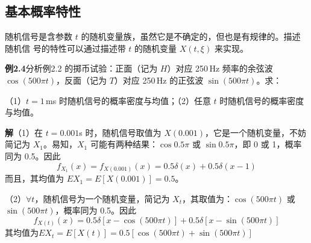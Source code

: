 \documentclass[11pt,openany,UTF8]{ctexbook}
\newcommand{\E}{E}                                 %
\begin{document}
\subsection{基本概率特性}
随机信号是含参数 $t$ 的随机变量族\nobreak，虽然它是不确定的\nobreak，但也是有规律的\nobreak。描述随机信
号的特性可以通过描述带 $t$ 的随机变量 $X(t,\xi)$ 来实现\nobreak。%

\begin{examplebox}
\textbf{例2.4}\quad 分析例2.2 的掷币试验\nobreak：正面（记为 $H$\nobreak）对应 250\,Hz 频率的余弦波 $\cos(500\pi t)$\nobreak，反面（记为 $T$\nobreak）对应 250\,Hz 的正弦波 $\sin(500\pi t)$\nobreak。求\nobreak：

（1\nobreak）$t=1$\,ms 时随机信号的概率密度与均值\nobreak；（2\nobreak）任意 $t$ 时随机信号的概率密度与均值\nobreak。

\textbf{解}\quad （1\nobreak）在 $t=0.001$s 时\nobreak，随机信号取值为 $X(0.001)$\nobreak，它是一个随机变量\nobreak，不妨简记为 $X_1$\nobreak。易知\nobreak，$X_1$ 可能有两种结果\nobreak：$\cos 0.5\pi$ 或 $\sin 0.5\pi$\nobreak，即 0 或 1\nobreak，概率同为 0.5\nobreak。因此
\[
  f_{X_1}(x)=f_{X(0.001)}(x)=0.5\delta(x)+0.5\delta(x-1)
\]
而且\nobreak，其均值为 $\E X_1=\E[X(0.001)]=0.5$\nobreak。

（2\nobreak）$\forall t$\nobreak，随机信号为一个随机变量\nobreak，简记为 $X_t$\nobreak，其取值为\nobreak：$\cos(500\pi t)$ 或 $\sin(500\pi t)$\nobreak，概率同为 0.5\nobreak。因此
\[
  f_{X(t)}(x)=0.5\delta[x-\cos(500\pi t)]+0.5\delta[x-\sin(500\pi t)]
\]
其均值为\hfill $\E X_t=\E[X(t)]=0.5[\cos(500\pi t)+\sin(500\pi t)]$
\end{examplebox}
\end{document}
